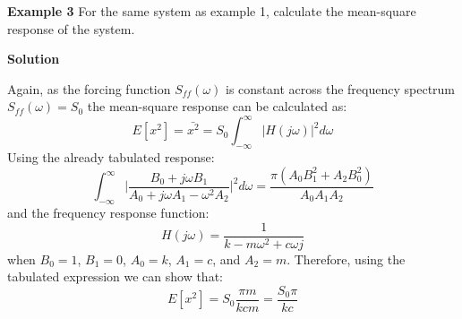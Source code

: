 \documentclass[12pt,a4paper]{article}
\begin{document}
  



\textbf{Example 3}
For the same system as example 1, calculate the mean-square response of the system. 

\textbf{Solution}

Again, as the forcing function $S_{ff}(\omega)$ is constant across the frequency spectrum $S_{ff}(\omega)=S_0$ the mean-square response can be calculated as:
\begin{equation}
E[x^2] = \bar{x^2} =   S_{0} \int_{-\infty}^{\infty} |H(j\omega)|^2 d\omega
\end{equation}
Using the already tabulated response:
\begin{equation}
\int_{-\infty}^{\infty} \bigg|\frac{B_0 + j \omega B_1}{A_0+j \omega A_1 - \omega^2 A_2} \bigg|^2 d\omega = \frac{\pi (A_0 B_1^2 + A_2 B_0^2)}{A_0 A_1 A_2}
\end{equation} 
and the frequency response function:
\begin{equation}
H(j\omega) = \frac{1}{k-m\omega^2+c\omega j}
\end{equation}
when $B_0=1$, $B_1 = 0$, $A_0=k$, $A_1=c$, and $A_2 =m$. Therefore, using the tabulated expression we can show that:
\begin{equation}
E[x^2] = S_0 \frac{\pi m }{k c m} =  \frac{S_0 \pi}{k c}
\end{equation} 
\end{document}
